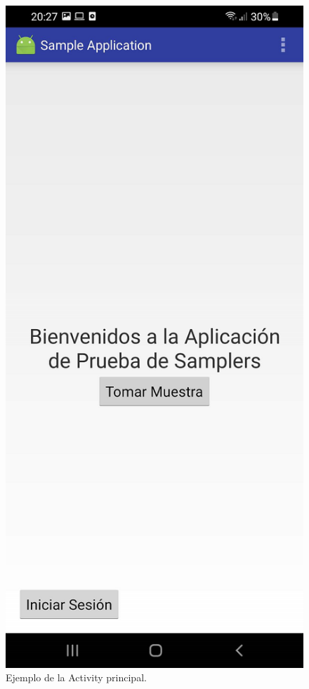 \begin{figure}[H]
  \centering
    \includegraphics[scale=0.3]{05-implementacion/SamplersMainActivity.png} 
   \caption{Ejemplo de la Activity principal.}
\end{figure}	



